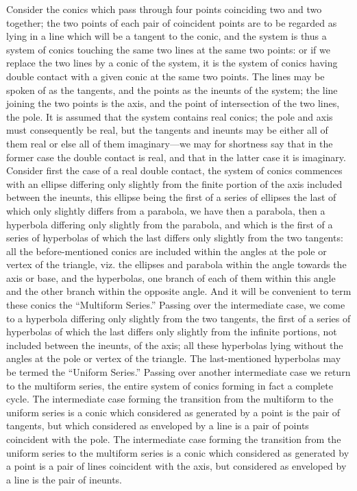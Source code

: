 \documentclass[11pt,a4paper]{book}
\begin{document}
Consider the conics which pass through four points coinciding two and two together; the two points of each pair of coincident points are to be regarded as lying in a line which will be a tangent to the conic, and the system is thus a system of conics touching the same two lines at the same two points: or if we replace the two lines by a conic of the system, it is the system of conics having double contact with a given conic at the same two points. The lines may be spoken of as the tangents, and the points as the ineunts of the system; the line joining the two points is the axis, and the point of intersection of the two lines, the pole. It is assumed that the system contains real conics; the pole and axis must consequently be real, but the tangents and ineunts may be either all of them real or else all of them imaginary---we may for shortness say that in the former case the double contact is real, and that in the latter case it is imaginary. Consider first the case of a real double contact, the system of conics commences with an ellipse differing only slightly from the finite portion of the axis included between the ineunts, this ellipse being the first of a series of ellipses the last of which only slightly differs from a parabola, we have then a parabola, then a hyperbola differing only slightly from the parabola, and which is the first of a series of hyperbolas of which the last differs only slightly from the two tangents: all the before-mentioned conics are included within the angles at the pole or vertex of the triangle, viz. the ellipses and parabola within the angle towards the axis or base, and the hyperbolas, one branch of each of them within this angle and the other branch within the opposite angle. And it will be convenient to term these conics the ``Multiform Series.'' Passing over the intermediate case, we come to a hyperbola differing only slightly from the two tangents, the first of a series of hyperbolas of which the last differs only slightly from the infinite portions, not included between the ineunts, of the axis; all these hyperbolas lying without the angles at the pole or vertex of the triangle. The last-mentioned hyperbolas may be termed the ``Uniform Series.'' Passing over another intermediate case we return to the multiform series, the entire system of conics forming in fact a complete cycle. The intermediate case forming the transition from the multiform to the uniform series is a conic which considered as generated by a point is the pair of tangents, but which considered as enveloped by a line is a pair of points coincident with the pole. The intermediate case forming the transition from the uniform series to the multiform series is a conic which considered as generated by a point is a pair of lines coincident with the axis, but considered as enveloped by a line is the pair of ineunts.
\end{document}
